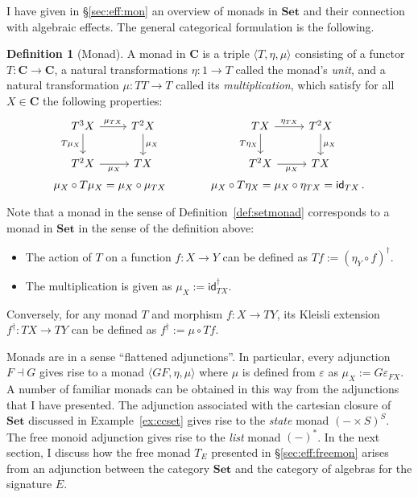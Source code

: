 \documentclass[11pt,oneside,draft]{book}
\theoremstyle{definition}
\newtheorem{definition}[theorem]{Definition}
\newcommand{\kw}[1]{\ensuremath{ \mathsf{#1} }}
\begin{document}
I have given in \S\ref{sec:eff:mon}
an overview of monads in $\mathbf{Set}$
and their connection with algebraic effects.
The general categorical formulation is the following.

\begin{definition}[Monad]
A monad in $\mathbf{C}$
is a triple $\langle T, \eta, \mu \rangle$
consisting of
a functor $T : \mathbf{C} \rightarrow \mathbf{C}$,
a natural transformations
$\eta : 1 \rightarrow T$
called the monad's \emph{unit},
and a natural transformation
$\mu : TT \rightarrow T$
called its \emph{multiplication},
which satisfy for all $X \in \mathbf{C}$
the following properties:
\[
  \begin{array}{c@{\hspace{4em}}c}
    \begin{tikzcd}
      T^3 X \ar[r, "\mu_{TX}"] \ar[d, "T \mu_X"'] &
      T^2 X \ar[d, "\mu_X"] \\
      T^2 X \ar[r, "\mu_X"'] &
      T X
    \end{tikzcd}
    &
    \begin{tikzcd}
      T X \ar[r, "\eta_{TX}"] \ar[d, "T \eta_X"'] &
      T^2 X \ar[d, "\mu_X"] \\
      T^2 X \ar[r, "\mu_X"'] &
      T X
    \end{tikzcd}
    \vspace{1ex}
    \\
    \mu_X \circ T \mu_X = \mu_X \circ \mu_{TX}
    &
    \mu_X \circ T \eta_X = \mu_X \circ \eta_{TX} = \kw{id}_{T X}
    \,.
  \end{array}
\]
\end{definition}

Note that a monad in the sense of Definition~\ref{def:setmonad}
corresponds to a monad in $\mathbf{Set}$
in the sense of the definition above:
\begin{itemize}
  \item
    The action of $T$ on a function $f : X \rightarrow Y$
    can be defined as $T f := (\eta_Y \circ f)^\dagger$.
  \item
    The multiplication is given as $\mu_X := \kw{id}_{T X}^\dagger$.
\end{itemize}
Conversely, for any monad $T$ and morphism $f : X \rightarrow TY$,
its Kleisli extension $f^\dagger : TX \rightarrow TY$ can be defined
as $f^\dagger := \mu \circ T f$.

Monads are in a sense ``flattened adjunctions''.
In particular, every adjunction $F \dashv G$ gives rise to a monad
$\langle GF, \eta, \mu \rangle$
where $\mu$ is defined from $\varepsilon$ as
$\mu_X := G \varepsilon_{F X}$.
A number of familiar monads can be obtained in this way
from the adjunctions that I have presented.
The adjunction associated with the cartesian closure of $\mathbf{Set}$
discussed in Example~\ref{ex:ccset}
gives rise to the \emph{state} monad $(- \times S)^S$.
The free monoid adjunction gives rise to
the \emph{list} monad $(-)^*$.
In the next section,
I discuss how the free monad $T_E$
presented in \S\ref{sec:eff:freemon}
arises from an adjunction between
the category $\mathbf{Set}$
and the category of algebras for the signature $E$.
\end{document}
